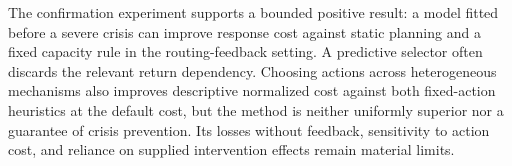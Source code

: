 The confirmation experiment supports a bounded positive result: a model fitted before a severe crisis can improve response cost against static planning and a fixed capacity rule in the routing-feedback setting. A predictive selector often discards the relevant return dependency. Choosing actions across heterogeneous mechanisms also improves descriptive normalized cost against both fixed-action heuristics at the default cost, but the method is neither uniformly superior nor a guarantee of crisis prevention. Its losses without feedback, sensitivity to action cost, and reliance on supplied intervention effects remain material limits.
